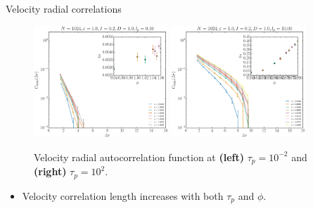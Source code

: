 \documentclass{beamer}
\begin{document}
\begin{frame}{Velocity radial correlations}

\begin{figure}
\centering
\includegraphics[width=0.45\textwidth]{cvvCMlog_No1024_Tl1000_Rn1000.eps}
\includegraphics[width=0.45\textwidth]{cvvCMlog_No1024_Tl1000_Rj1000.eps}
\caption{Velocity radial autocorrelation function at {\bf (left)} $\tau_p = 10^{-2}$ and {\bf (right)} $\tau_p = 10^2$.}
\end{figure}

\begin{itemize}
  \item Velocity correlation length increases with both $\tau_p$ and $\phi$.
\end{itemize}

\end{frame}
\end{document}
